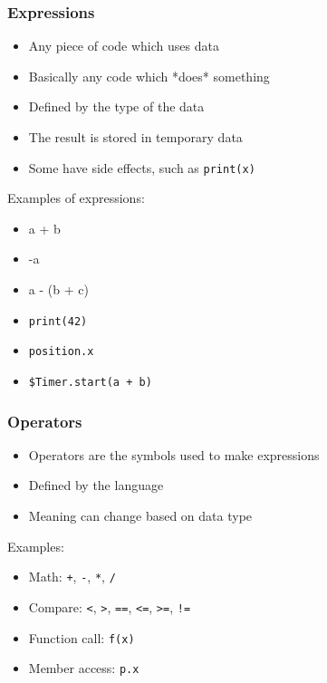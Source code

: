 \documentclass{beamer}
\newenvironment{xframe}[2][]
{
    \begin{frame}[fragile,environment=xframe,#1]
    \frametitle{#2}
}{
    \end{frame}
}
\begin{document}
\begin{xframe}{Expressions}
    \begin{itemize}
        \item Any piece of code which uses data
        \item Basically any code which *does* something
        \item Defined by the type of the data
        \item The result is stored in temporary data
        \item Some have side effects, such as \texttt{print(x)}
    \end{itemize}

    \pause
    \bigskip

    Examples of expressions:
    \begin{itemize}
        \item a + b
        \item -a
        \item a - (b + c)
        \item \texttt{print(42)}
        \item \texttt{position.x}
        \item \texttt{\$Timer.start(a + b)}
    \end{itemize}

\end{xframe}

\begin{xframe}{Operators}
    \begin{itemize}
        \item Operators are the symbols used to make expressions
        \item Defined by the language
        \item Meaning can change based on data type
    \end{itemize}

    \bigskip

    Examples:
    \begin{itemize}
        \item Math: \texttt{+}, \texttt{-}, \texttt{*}, \texttt{/}
        \item Compare: \texttt{<}, \texttt{>}, \texttt{==}, \texttt{<=}, \texttt{>=}, \texttt{!=}
        \item Function call: \texttt{f(x)}
        \item Member access: \texttt{p.x}
    \end{itemize}
\end{xframe}
\end{document}
